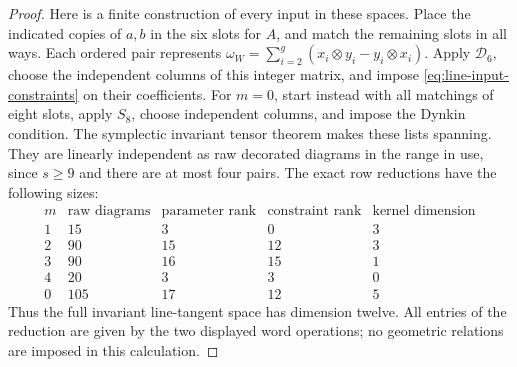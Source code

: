 \documentclass[11pt]{article}
\theoremstyle{definition}\newtheorem{definition}[theorem]{Definition}
\begin{document}
\begin{proof}
Here is a finite construction of every input in these
spaces. Place the indicated copies of $a,b$ in the six
slots for $A$, and match the remaining slots in all ways.
Each ordered pair represents
$\omega_W=\sum_{i=2}^g(x_i\otimes y_i-y_i\otimes x_i)$.
Apply $\mathcal D_6$, choose the independent columns of
this integer matrix, and impose
\eqref{eq:line-input-constraints} on their coefficients.
For $m=0$, start instead with all matchings of eight slots,
apply $S_8$, choose independent columns, and impose the
Dynkin condition. The symplectic invariant tensor theorem
\cite[Proposition~2.1, author p.~8]{MSS2015}
makes these lists spanning. They are linearly independent
as raw decorated diagrams in the range in use, since
$s\geq9$ and there are at most four pairs.
The exact row reductions have the following sizes:
\[
\begin{array}{c|rrrr}
m&\text{raw diagrams}&\text{parameter rank}&
       \text{constraint rank}&\text{kernel dimension}\\\hline
1&15&3&0&3\\
2&90&15&12&3\\
3&90&16&15&1\\
4&20&3&3&0\\
0&105&17&12&5
\end{array}
\]
Thus the full invariant line-tangent space has dimension
twelve. All entries of the reduction are given by the
two displayed word operations; no geometric relations
are imposed in this calculation.


\end{proof}
\end{document}

